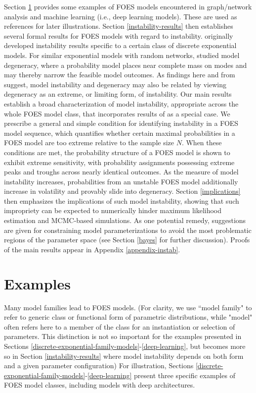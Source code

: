 \documentclass[numbib]{imamat}
\theoremstyle{theorem}
\theoremstyle{lemma}
\theoremstyle{example}
\theoremstyle{corollary}
\theoremstyle{definition}
\theoremstyle{remark}
\theoremstyle{approximation}
\theoremstyle{scheme}
\newcommand{\ak}[1]{{\color{blue} #1}}
\begin{document}
Section \ref{examples} provides some examples of FOES models encountered in graph/network analysis and machine learning (i.e., deep learning models). These are used as references for later illustrations. Section \ref{instability-results} then establishes several formal results for FOES models with regard to instability. \citet{schweinberger2011instability} originally developed instability results specific to a certain class of discrete exponential models. For similar exponential models with random networks, \citet{handcock2003assessing} studied model degeneracy, where a probability model places near complete mass on modes and may thereby narrow the feasible model outcomes. As findings here and from \citet{schweinberger2011instability} suggest, model instability and degeneracy may also be related by viewing degeneracy as an extreme, or limiting form, of instability. Our main results establish a broad characterization of model instability, appropriate across the whole FOES model class, that incorporates results of \citet{schweinberger2011instability} as a special case. We prescribe a general and simple condition for identifying instability in a FOES model sequence, which quantifies whether certain maximal probabilities in a FOES model are too extreme relative to the sample size \(N\). When these conditions are met, the probability structure of a FOES model is shown to exhibit extreme sensitivity, with probability assignments possessing extreme peaks and troughs across nearly identical outcomes. As the measure of model instability increases, probabilities from an unstable FOES model additionally increase in volatility and provably slide into degeneracy. Section \ref{implications} then emphasizes the implications of such model instability, showing that such impropriety can be expected to numerically hinder maximum likelihood estimation and MCMC-based simulations. As one potential remedy, suggestions are given for constraining model parameterizations to avoid the most problematic regions of the parameter space \ak{(see Section \ref{bayes} for further discussion)}. Proofs of the main results appear in Appendix \ref{appendix-instab}.

\hypertarget{examples}{%
\section{Examples}\label{examples}}

Many model families \ak{lead to} FOES models. \ak{(For clarity, we use ``model family" to refer to generic class or functional form of parametric distributions, while "model" often refers here to a member of the class for an instantiation or selection of parameters. This distinction is not so important for the examples presented in Sections \ref{discrete-exponential-family-models}-\ref{deep-learning}, but becomes more so in Section \ref{instability-results} where model instability depends on both form and a given parameter configuration)} For illustration, \ak{Sections \ref{discrete-exponential-family-models}-\ref{deep-learning} present} three specific examples of FOES model \ak{classes}, including models with deep architectures.
\end{document}
